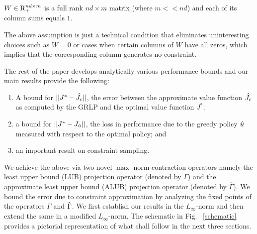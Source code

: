 \begin{assumption}\label{wassump}
$W \in \mathrm{R}^{nd\times m}_+$ is a full rank $nd\times m$  matrix (where $m<<nd$) and each of its column sums equals $1$.
\end{assumption}
The above assumption is just a technical condition that eliminates uninteresting choices such as $W=0$ or cases when certain columns of $W$ have all zeros, which implies that the corresponding column generates no constraint.

The rest of the paper develops analytically various performance bounds and our main results provide the following:
\begin{enumerate}
\item A bound for $||J^*-\hat{J}_c||$, the error between the approximate value function $\hat{J}_c$ as computed by the GRLP and the optimal value function $J^*$;
\item a bound for $||J^*-J_{\hat{u}}||$, the loss in performance due to the greedy policy $\hat{u}$ measured with respect to the optimal policy; and
\item an important result on constraint sampling.
\end{enumerate}
We achieve the above via two novel $\max$-norm contraction operators namely the least upper bound (LUB) projection operator (denoted by $\Gamma$) and the approximate least upper bound (ALUB) projection operator (denoted by $\hat{\Gamma}$). We bound the error due to constraint approximation by analyzing the fixed points of the operators $\Gamma$ and $\hat{\Gamma}$. We first establish our results in the $L_\infty$-norm and then extend the same in a modified $L_\infty$-norm. The schematic in Fig. ~\ref{schematic} provides a pictorial representation of what shall follow in the next three sections.
\FloatBarrier



